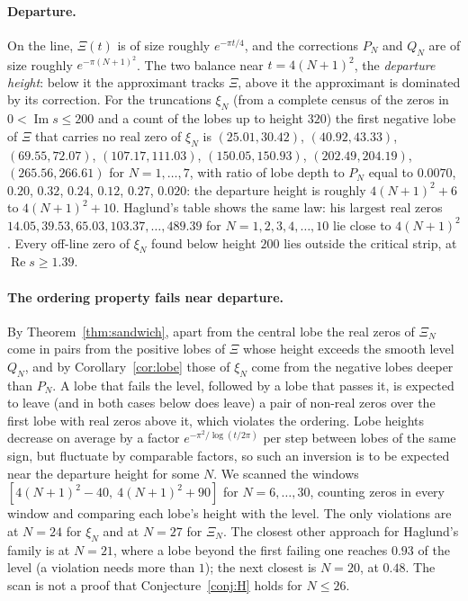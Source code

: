\documentclass[11pt]{article}
\theoremstyle{plain}
\theoremstyle{definition}
\theoremstyle{remark}
\newcommand{\re}{\operatorname{Re}}
\newcommand{\im}{\operatorname{Im}}
\begin{document}
\paragraph{Departure.} On the line, $\Xi(t)$ is of size roughly $e^{-\pi t/4}$,
and the corrections $P_N$ and $Q_N$ are of size roughly $e^{-\pi(N+1)^2}$. The
two balance near $t = 4(N+1)^2$, the \emph{departure height}: below it the
approximant tracks $\Xi$, above it the approximant is dominated by its
correction. For the truncations $\xi_N$ (from a complete census of the zeros
in $0 < \im s \le 200$ and a count of the lobes up to height $320$) the first
negative lobe of $\Xi$ that carries no real zero of $\xi_N$ is $(25.01, 30.42)$, $(40.92, 43.33)$, $(69.55, 72.07)$,
$(107.17, 111.03)$, $(150.05, 150.93)$, $(202.49, 204.19)$, $(265.56, 266.61)$
for $N = 1, \ldots, 7$, with ratio of lobe depth to $P_N$ equal to $0.0070$,
$0.20$, $0.32$, $0.24$, $0.12$, $0.27$, $0.020$: the departure height is
roughly $4(N+1)^2 + 6$ to $4(N+1)^2 + 10$. Haglund's table shows the same law: his
largest real zeros $14.05, 39.53, 65.03, 103.37, \ldots, 489.39$ for
$N = 1, 2, 3, 4, \ldots, 10$ lie close to $4(N+1)^2$. Every off-line zero of
$\xi_N$ found below height $200$ lies outside the critical strip, at
$\re s \ge 1.39$.

\paragraph{The ordering property fails near departure.} By
Theorem~\ref{thm:sandwich}, apart from the central lobe the real zeros of
$\Xi_N$ come in pairs from the positive lobes of $\Xi$ whose height exceeds the
smooth level $Q_N$, and by
Corollary~\ref{cor:lobe} those of $\xi_N$ come from the negative lobes deeper
than $P_N$. A lobe that fails the level, followed by a lobe that passes it, is expected to
leave (and in both cases below does leave) a pair of non-real zeros over the first
lobe with real zeros above it, which violates the ordering. Lobe heights decrease on average by a factor
$e^{-\pi^2/\log(t/2\pi)}$ per step between lobes of the same sign, but fluctuate
by comparable factors, so such an inversion is to be expected near the
departure height for some $N$. We scanned the windows
$[4(N+1)^2 - 40,\ 4(N+1)^2 + 90]$ for $N = 6, \ldots, 30$, counting
zeros in every window and comparing each lobe's height with the level. The only
violations are at $N = 24$ for $\xi_N$ and at $N = 27$ for $\Xi_N$. The closest
other approach for Haglund's family is at $N = 21$, where a lobe beyond the first
failing one reaches $0.93$ of the level (a violation needs more than $1$); the
next closest is $N = 20$, at $0.48$. The scan is not a proof that
Conjecture~\ref{conj:H} holds for $N \le 26$.
\end{document}
